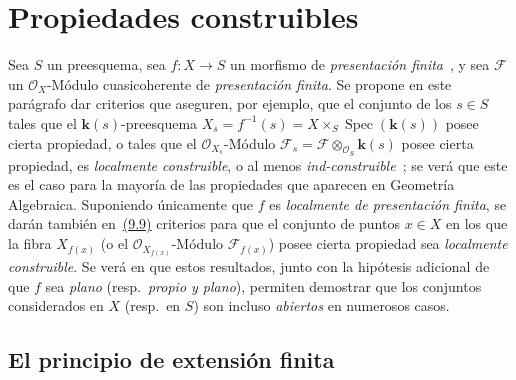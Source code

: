 \section{Propiedades construibles}
\label{section:IV.9}

Sea $S$ un preesquema, sea $f:X\to S$ un morfismo de \emph{presentación finita}~,
y sea $\mathcal F$ un $\mathcal O_X$-Módulo cuasicoherente de \emph{presentación finita}.
Se propone en este parágrafo dar criterios que aseguren, por ejemplo, que el conjunto de los $s\in S$ tales que el $\boldsymbol{k}(s)$-preesquema $X_s=f^{-1}(s)=X\times_S\operatorname{Spec}(\boldsymbol{k}(s))$ posee cierta propiedad, o tales que el $\mathcal O_{X_s}$-Módulo $\mathcal F_s=\mathcal F\otimes_{\mathcal O_S}\boldsymbol{k}(s)$ posee cierta propiedad, es \emph{localmente construible}, o al menos \emph{ind-construible}~; se verá que este es el caso para la mayoría de las propiedades que aparecen en Geometría Algebraica.
Suponiendo únicamente que $f$ es \emph{localmente de presentación finita}, se darán también en~{\hyperlink{ega4.c04.subsec.9-9}{(9.9)}} criterios para que el conjunto de puntos $x\in X$ en los que la fibra $X_{f(x)}$ (o el $\mathcal O_{X_{f(x)}}$-Módulo $\mathcal F_{f(x)}$) posee cierta propiedad sea \emph{localmente construible}.
Se verá en  que estos resultados, junto con la hipótesis adicional de que $f$ sea \emph{plano} (resp.\ \emph{propio y plano}), permiten demostrar que los conjuntos considerados en $X$ (resp.\ en $S$) son incluso \emph{abiertos} en numerosos casos.

\subsection{El principio de extensión finita}
\label{subsection:IV.9.1}

